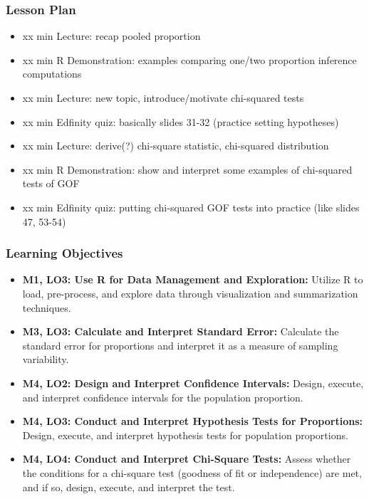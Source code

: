 \begin{frame}
    \frametitle{Lesson Plan}
    \begin{itemize}
        \item xx min Lecture: recap pooled proportion
        \item xx min R Demonstration: examples comparing one/two proportion inference computations
        \item xx min Lecture: new topic, introduce/motivate chi-squared tests
        \item xx min Edfinity quiz: basically slides 31-32 (practice setting hypotheses)
        \item xx min Lecture: derive(?) chi-square statistic, chi-squared distribution
        \item xx min R Demonstration: show and interpret some examples of chi-squared tests of GOF
        \item xx min Edfinity quiz: putting chi-squared GOF tests into practice (like slides 47, 53-54)
    \end{itemize}
\end{frame}
            
\begin{frame}
    \frametitle{Learning Objectives}
    \begin{itemize}
        \item \textbf{M1, LO3: Use R for Data Management and Exploration:} Utilize R to load, pre-process, and explore data through visualization and summarization techniques.
        \item \textbf{M3, LO3: Calculate and Interpret Standard Error:} Calculate the standard error for proportions and interpret it as a measure of sampling variability.
        \item \textbf{M4, LO2: Design and Interpret Confidence Intervals:} Design, execute, and interpret confidence intervals for the population proportion.
        \item \textbf{M4, LO3: Conduct and Interpret Hypothesis Tests for Proportions:} Design, execute, and interpret hypothesis tests for population proportions.
        \item \textbf{M4, LO4: Conduct and Interpret Chi-Square Tests:} Assess whether the conditions for a chi-square test (goodness of fit or independence) are met, and if so, design, execute, and interpret the test.
    \end{itemize}
\end{frame}
    
